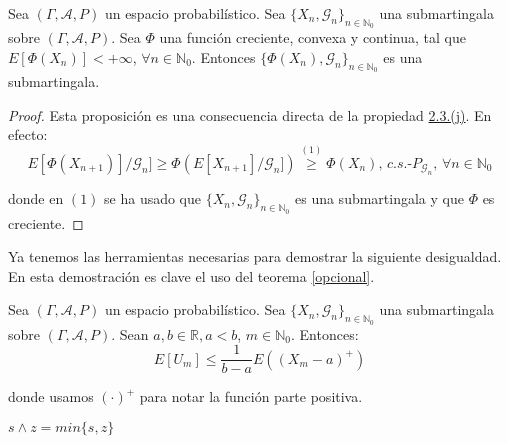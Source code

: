 \begin{proposicion}\label{convexoMartingala}
Sea $(\Gamma , \mathcal{A}, P)$ un espacio probabilístico. Sea $\{X_n, \mathscr{G}_n\}_{n\in \mathds{N}_0}$ una submartingala sobre $(\Gamma , \mathcal{A}, P)$. Sea $\Phi$ una función creciente, convexa y continua, tal que $E[\Phi(X_n)]< + \infty$, $\forall n\in\mathds{N}_0$. Entonces $\{\Phi(X_n), \mathscr{G}_n\}_{n\in \mathds{N}_0}$ es una submartingala.
\end{proposicion}

\begin{proof}
Esta proposición es una consecuencia directa de la propiedad \hyperref[PropS5]{2.3.(j)}. En efecto:
$$ E[\Phi(X_{n+1})]/\mathscr{G}_n] \geq \Phi(E[X_{n+1}]/\mathscr{G}_n]) \overset{(1)}{\geq} \Phi(X_n)\text{, }c.s.\text{-}P_{\mathscr{G}_n}\text{, }\forall n\in\mathds{N}_0 $$

donde en $(1)$ se ha usado que $\{X_n, \mathscr{G}_n\}_{n\in \mathds{N}_0}$ es una submartingala y que $\Phi$ es creciente.

\end{proof}

Ya tenemos las herramientas necesarias para demostrar la siguiente desigualdad. En esta demostración es clave el uso del teorema \ref{opcional}.

\begin{teorema}\label{desigualdad}
Sea $(\Gamma , \mathcal{A}, P)$ un espacio probabilístico. Sea $\{X_n, \mathscr{G}_n\}_{n\in \mathds{N}_0}$ una submartingala sobre $(\Gamma , \mathcal{A}, P)$. Sean $a,b\in\mathds{R}, a<b$, $m\in\mathds{N}_0$. Entonces:
$$E[U_m]\leq \frac{1}{b-a} E((X_m-a)^+)$$

donde usamos $(\cdot )^+$ para notar la función parte positiva.

\end{teorema}

\begin{notacion}
$s\wedge z = min\{s,z\}$
\end{notacion}

